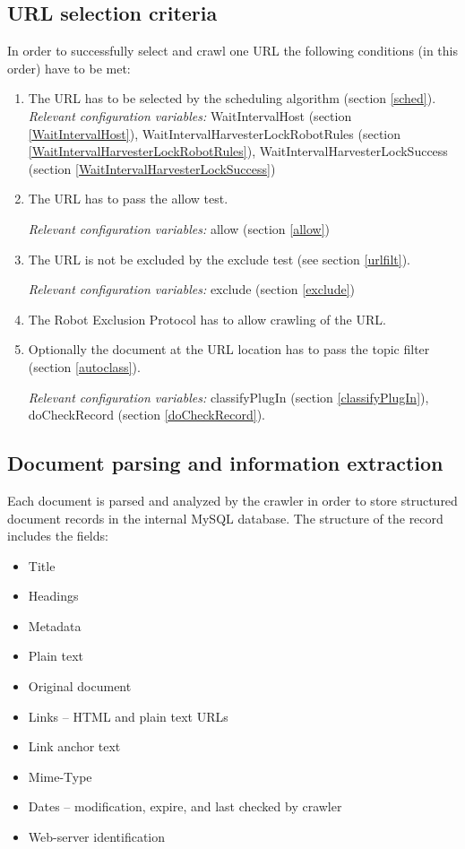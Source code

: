 \subsection{URL selection criteria}
In order to successfully select and crawl one URL the following conditions
(in this order) have to be met:
\begin{enumerate}
\item The URL has to be selected by the scheduling algorithm (section
\ref{sched}).\\

{\em Relevant configuration variables:}
WaitIntervalHost (section \ref{WaitIntervalHost}),
WaitIntervalHarvesterLockRobotRules (section \ref{WaitIntervalHarvesterLockRobotRules}),
WaitIntervalHarvesterLockSuccess (section \ref{WaitIntervalHarvesterLockSuccess})

\item The URL has to pass the allow test.

{\em Relevant configuration variables:} allow (section \ref{allow})

\item The URL is not be excluded by the exclude test (see section
\ref{urlfilt}).

{\em Relevant configuration variables:} exclude (section \ref{exclude})

\item The Robot Exclusion Protocol has to allow crawling of the URL.

\item Optionally the document at the URL location has to pass the topic filter
(section \ref{autoclass}).


{\em Relevant configuration variables:}
classifyPlugIn (section \ref{classifyPlugIn}),
doCheckRecord (section \ref{doCheckRecord}).

\end{enumerate}

\subsection{Document parsing and information extraction}

Each document is parsed and analyzed by the crawler in order to store
structured document records in the internal MySQL database. The
structure of the record includes the fields:
\begin{itemize}
\item Title
\item Headings
\item Metadata
\item Plain text
\item Original document
\item Links -- HTML and plain text URLs
\item Link anchor text
\item Mime-Type
\item Dates -- modification, expire, and last checked by crawler
\item Web-server identification
\end{itemize}

